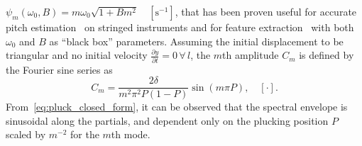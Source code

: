 $  \psi_m(\omega_0,B) = m \omega_0 \sqrt{1+B m^2} \quad [\text{s}^{-1}]$, 
that has been proven useful for accurate pitch estimation~\cite{galembo1994measuring, nillson:multipitch_inharmonic_signals} on stringed instruments and for feature extraction~\cite{michelson2018_aes,abesser2012feature,barbancho:inharmonicity_tablature} with both $\omega_0$ and $B$ as ``black box'' parameters.
Assuming the initial displacement to be triangular and no initial velocity $\frac{\partial y}{\partial t} = 0 \, \forall\, l$, the $m$th amplitude $C_m$ is defined by the Fourier sine series as~\cite{donkin:acoustics,fletcher:principles_of_vibration_and_sound}
\begin{equation}\label{eq:pluck_closed_form}
    C_m = \frac{2\delta}{m^2\pi^2P(1-P)}\sin(m\pi P), \quad [\cdot].
\end{equation}
From~\eqref{eq:pluck_closed_form}, it can be observed that the spectral envelope is sinusoidal along the partials, and dependent only on the plucking position $P$ scaled by $m^{-2}$ for the $m$th mode.

